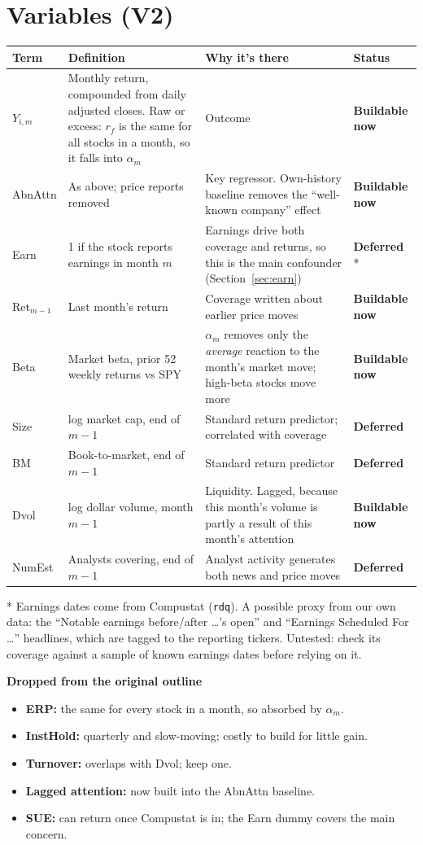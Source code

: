 \documentclass[11pt]{article}
\newcommand{\canbuild}{\textcolor{TealBlue}{\textbf{Buildable now}}}
\newcommand{\dl}{\textcolor{BurntOrange}{\textbf{Deferred}}}
\newcommand{\var}[1]{\texttt{#1}}
\begin{document}
\section{Variables (V2)}

\begin{longtable}{>{\raggedright}p{2.0cm} >{\raggedright}p{4.6cm} >{\raggedright}p{5.2cm} p{2.3cm}}
\toprule
\textbf{Term} & \textbf{Definition} & \textbf{Why it's there} & \textbf{Status}\\
\midrule\endhead
$Y_{i,m}$ & Monthly return, compounded from daily adjusted closes. Raw or excess: $r_f$ is the same for all stocks in a month, so it falls into $\alpha_m$ & Outcome & \canbuild\\
AbnAttn & As above; price reports removed & Key regressor. Own-history baseline removes the ``well-known company'' effect & \canbuild\\
Earn & 1 if the stock reports earnings in month $m$ & Earnings drive both coverage and returns, so this is the main confounder (Section~\ref{sec:earn}) & \dl{} *\\
Ret$_{m-1}$ & Last month's return & Coverage written about earlier price moves & \canbuild\\
Beta & Market beta, prior 52 weekly returns vs SPY & $\alpha_m$ removes only the \emph{average} reaction to the month's market move; high-beta stocks move more & \canbuild\\
Size & log market cap, end of $m-1$ & Standard return predictor; correlated with coverage & \dl\\
BM & Book-to-market, end of $m-1$ & Standard return predictor & \dl\\
Dvol & log dollar volume, month $m-1$ & Liquidity. Lagged, because this month's volume is partly a result of this month's attention & \canbuild\\
NumEst & Analysts covering, end of $m-1$ & Analyst activity generates both news and price moves & \dl\\
\bottomrule
\end{longtable}

* Earnings dates come from Compustat (\var{rdq}). A possible proxy from our own data: the ``Notable earnings before/after \ldots's open'' and ``Earnings Scheduled For \ldots'' headlines, which are tagged to the reporting tickers. Untested: check its coverage against a sample of known earnings dates before relying on it.

\textbf{Dropped from the original outline}
\begin{itemize}
  \item \textbf{ERP:} the same for every stock in a month, so absorbed by $\alpha_m$.
  \item \textbf{InstHold:} quarterly and slow-moving; costly to build for little gain.
  \item \textbf{Turnover:} overlaps with Dvol; keep one.
  \item \textbf{Lagged attention:} now built into the AbnAttn baseline.
  \item \textbf{SUE:} can return once Compustat is in; the Earn dummy covers the main concern.
\end{itemize}
\end{document}

